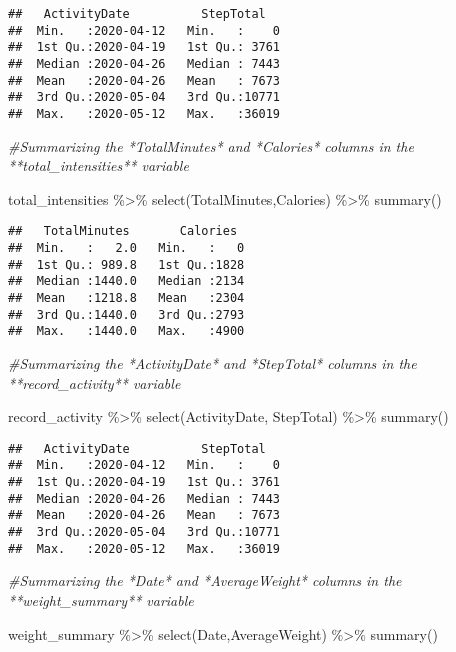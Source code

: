\documentclass[
]{article}
\newenvironment{Shaded}{\begin{snugshade}}{\end{snugshade}}
\newcommand{\CommentTok}[1]{\textcolor[rgb]{0.56,0.35,0.01}{\textit{#1}}}
\newcommand{\FunctionTok}[1]{\textcolor[rgb]{0.00,0.00,0.00}{#1}}
\newcommand{\NormalTok}[1]{#1}
\newcommand{\SpecialCharTok}[1]{\textcolor[rgb]{0.00,0.00,0.00}{#1}}
\begin{document}
\begin{verbatim}
##   ActivityDate          StepTotal    
##  Min.   :2020-04-12   Min.   :    0  
##  1st Qu.:2020-04-19   1st Qu.: 3761  
##  Median :2020-04-26   Median : 7443  
##  Mean   :2020-04-26   Mean   : 7673  
##  3rd Qu.:2020-05-04   3rd Qu.:10771  
##  Max.   :2020-05-12   Max.   :36019
\end{verbatim}

\begin{Shaded}
\begin{Highlighting}[]
\CommentTok{\#Summarizing the *TotalMinutes* and *Calories* columns in the **total\_intensities** variable }

\NormalTok{total\_intensities }\SpecialCharTok{\%\textgreater{}\%}
  \FunctionTok{select}\NormalTok{(TotalMinutes,Calories) }\SpecialCharTok{\%\textgreater{}\%}
  \FunctionTok{summary}\NormalTok{()}
\end{Highlighting}
\end{Shaded}

\begin{verbatim}
##   TotalMinutes       Calories   
##  Min.   :   2.0   Min.   :   0  
##  1st Qu.: 989.8   1st Qu.:1828  
##  Median :1440.0   Median :2134  
##  Mean   :1218.8   Mean   :2304  
##  3rd Qu.:1440.0   3rd Qu.:2793  
##  Max.   :1440.0   Max.   :4900
\end{verbatim}

\begin{Shaded}
\begin{Highlighting}[]
\CommentTok{\#Summarizing the *ActivityDate* and *StepTotal* columns in the **record\_activity** variable }

\NormalTok{record\_activity }\SpecialCharTok{\%\textgreater{}\%} 
  \FunctionTok{select}\NormalTok{(ActivityDate, StepTotal) }\SpecialCharTok{\%\textgreater{}\%}
  \FunctionTok{summary}\NormalTok{()}
\end{Highlighting}
\end{Shaded}

\begin{verbatim}
##   ActivityDate          StepTotal    
##  Min.   :2020-04-12   Min.   :    0  
##  1st Qu.:2020-04-19   1st Qu.: 3761  
##  Median :2020-04-26   Median : 7443  
##  Mean   :2020-04-26   Mean   : 7673  
##  3rd Qu.:2020-05-04   3rd Qu.:10771  
##  Max.   :2020-05-12   Max.   :36019
\end{verbatim}

\begin{Shaded}
\begin{Highlighting}[]
\CommentTok{\#Summarizing the *Date* and *AverageWeight* columns in the **weight\_summary** variable }

\NormalTok{weight\_summary }\SpecialCharTok{\%\textgreater{}\%}
  \FunctionTok{select}\NormalTok{(Date,AverageWeight) }\SpecialCharTok{\%\textgreater{}\%}
  \FunctionTok{summary}\NormalTok{()}
\end{Highlighting}
\end{Shaded}
\end{document}
